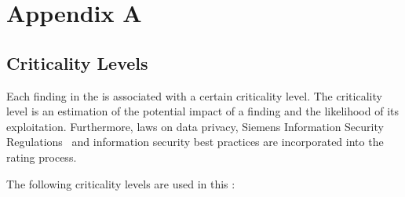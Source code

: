 %
%
%
\clearpage

\chapter{Appendix A}
\label{appendix:AppendixA}


\section{Criticality Levels}
\label{appendix:CriticalityLevels} 

Each finding in the \ReportProjectType is associated with a certain criticality level. The criticality level is an estimation of the potential impact of a finding and the likelihood of its exploitation. Furthermore, laws on data privacy, Siemens Information Security Regulations~\cite{InfoSecPolicy} and information security best practices are incorporated into the rating process.

The following criticality levels are used in this \ReportProjectType:


